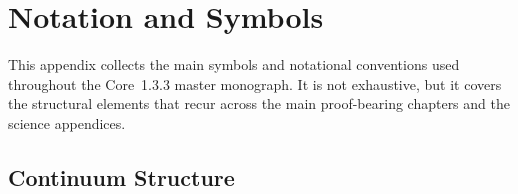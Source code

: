 
\section{Notation and Symbols}
\label{app:notation}

This appendix collects the main symbols and notational conventions used
throughout the Core~1.3.3 master monograph. It is not exhaustive, but it covers
the structural elements that recur across the main proof-bearing chapters and
the science appendices.

\begingroup
\footnotesize
\RaggedRight
\sloppy

\subsection{Continuum Structure}

